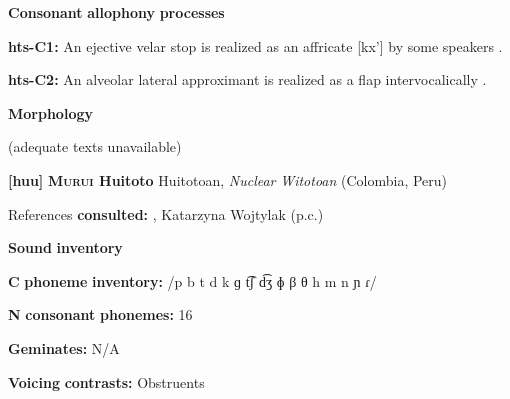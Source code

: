 \documentclass[output=paper]{langsci/langscibook}
\begin{document}
\begin{styleBody}
\textbf{Consonant} \textbf{allophony} \textbf{processes}
\end{styleBody}

\begin{styleBody}
\textbf{hts-C1:} An ejective velar stop is realized as an affricate [kx’] by some speakers \citep[41]{Sands2013}.
\end{styleBody}

\begin{styleBody}
\textbf{hts-C2:} An alveolar lateral approximant is realized as a flap intervocalically \citep[41]{Sands2013}.
\end{styleBody}

\begin{styleBody}
\textbf{Morphology}
\end{styleBody}

\begin{styleBody}
(adequate texts unavailable)
\end{styleBody}

\begin{styleBody}
\textbf{[huu]}   \textbf{\textsc{Murui} \textbf{Huitoto}  }  Huitotoan, \textit{Nuclear} \textit{Witotoan} (Colombia, Peru)
\end{styleBody}

\begin{styleBody}
References \textbf{consulted:} \citet{Wojtylak2017}, Katarzyna Wojtylak (p.c.)
\end{styleBody}

\begin{styleBody}
\textbf{Sound} \textbf{inventory}
\end{styleBody}

\begin{styleBody}
\textbf{C} \textbf{phoneme} \textbf{inventory:} /p b t d k ɡ t͡ʃ d͡ʒ ɸ β θ h m n ɲ ɾ/
\end{styleBody}

\begin{styleBody}
\textbf{N} \textbf{consonant} \textbf{phonemes:} 16
\end{styleBody}

\begin{styleBody}
\textbf{Geminates:} N/A
\end{styleBody}

\begin{styleBody}
\textbf{Voicing} \textbf{contrasts:} Obstruents
\end{styleBody}
\end{document}
